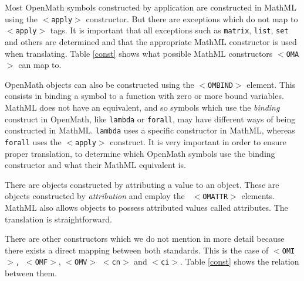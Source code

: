 Most OpenMath symbols constructed by application are constructed in
MathML using the {\tt $<$apply$>$} constructor. But there are
exceptions which do not map to {\tt $<$apply$>$} tags. It is important
that all exceptions such as \verb|matrix|, \verb|list|, \verb|set| and
others are determined and that the appropriate MathML constructor is
used when translating. Table \ref{const} shows what possible MathML
constructors {\tt $<$OMA$>$} can map to.

OpenMath objects can also be constructed using the
\texttt{$<$OMBIND$>$} element.  This consists in binding a symbol to a
function with zero or more bound variables.  MathML does not have an
equivalent, and so symbols which use the {\it binding} construct in
OpenMath, like {\tt lambda} or {\tt forall}, may have different ways of
being constructed in MathML. {\tt lambda} uses a specific constructor
in MathML, whereas {\tt forall} uses the {\tt $<$apply$>$} construct.
It is very important in order to ensure proper translation, to
determine which OpenMath symbols use the binding constructor and what
their MathML equivalent is.

There are objects constructed by attributing a value to an object.
These are objects constructed by {\it attribution} and employ the {\tt
$<$OMATTR$>$} elements. MathML also allows objects to possess
attributed values called attributes. The translation is
straightforward.

There are other constructors which we do not mention in more detail
because there exists a direct mapping between both standards. This is
the case of \texttt{$<$OMI$>$, $<$OMF$>$}, \texttt{$<$OMV$>$}
\texttt{$<$cn$>$} and \texttt{$<$ci$>$}. Table \ref{const} shows the
relation between them.

